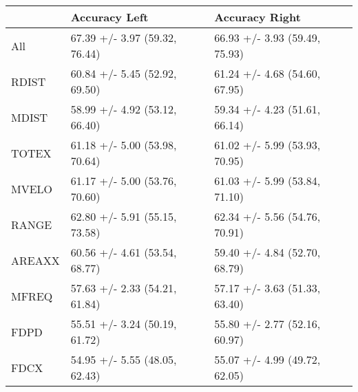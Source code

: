 \begin{tabular}{lll}
\toprule
{} &                  Accuracy Left &                 Accuracy Right \\
\midrule
All    &  67.39 +/- 3.97 (59.32, 76.44) &  66.93 +/- 3.93 (59.49, 75.93) \\
RDIST  &  60.84 +/- 5.45 (52.92, 69.50) &  61.24 +/- 4.68 (54.60, 67.95) \\
MDIST  &  58.99 +/- 4.92 (53.12, 66.40) &  59.34 +/- 4.23 (51.61, 66.14) \\
TOTEX  &  61.18 +/- 5.00 (53.98, 70.64) &  61.02 +/- 5.99 (53.93, 70.95) \\
MVELO  &  61.17 +/- 5.00 (53.76, 70.60) &  61.03 +/- 5.99 (53.84, 71.10) \\
RANGE  &  62.80 +/- 5.91 (55.15, 73.58) &  62.34 +/- 5.56 (54.76, 70.91) \\
AREAXX &  60.56 +/- 4.61 (53.54, 68.77) &  59.40 +/- 4.84 (52.70, 68.79) \\
MFREQ  &  57.63 +/- 2.33 (54.21, 61.84) &  57.17 +/- 3.63 (51.33, 63.40) \\
FDPD   &  55.51 +/- 3.24 (50.19, 61.72) &  55.80 +/- 2.77 (52.16, 60.97) \\
FDCX   &  54.95 +/- 5.55 (48.05, 62.43) &  55.07 +/- 4.99 (49.72, 62.05) \\
\bottomrule
\end{tabular}
